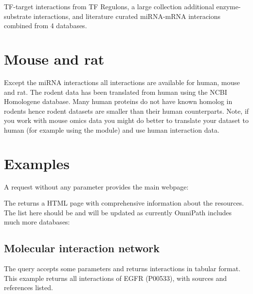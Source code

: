 \documentclass[letterpaper,10pt,english]{sphinxmanual}
\begin{document}
TF-target interactions from TF Regulons, a large collection additional
enzyme-substrate interactions, and literature curated miRNA-mRNA interacions
combined from 4 databases.


\section{Mouse and rat}
\label{\detokenize{index:mouse-and-rat}}
Except the miRNA interactions all interactions are available for human, mouse
and rat. The rodent data has been translated from human using the NCBI
Homologene database. Many human proteins do not have known homolog in rodents
hence rodent datasets are smaller than their human counterparts. Note, if you
work with mouse omics data you might do better to translate your dataset to
human (for example using the  module) and use human
interaction data.


\section{Examples}
\label{\detokenize{index:examples}}
A request without any parameter provides the main webpage:
\begin{quote}

\end{quote}

The  returns a HTML page with comprehensive information about the
resources. The list here should be and will be updated as currently OmniPath
includes much more databases:
\begin{quote}

\end{quote}


\subsection{Molecular interaction network}
\label{\detokenize{index:molecular-interaction-network}}
The  query accepts some parameters and returns interactions in
tabular format. This example returns all interactions of EGFR (P00533), with
sources and references listed.
\begin{quote}

\end{quote}
\end{document}
